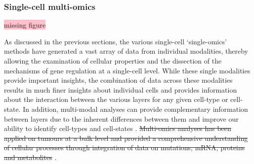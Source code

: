 
\subsubsection{Single-cell multi-omics}
\colorbox{pink}{missing figure}

As discussed in the previous sections, the various single-cell ‘single-omics’ methods have generated a vast array of data from individual modalities, thereby allowing the examination of cellular properties and the dissection of the mechanisms of gene regulation at a single-cell level. While these single modalities provide important insights, the combination of data across these modalities results in much finer insights about individual cells and provides information about the interaction between the various layers for any given cell-type or cell-state. In addition, multi-modal analyses can provide complementary information between layers due to the inherent differences between them and improve our ability to identify cell-types and cell-states \textbf{\cite{flynn_single-cell_2023}}. \st{Multi-omics analyses has been applied on tumours at a bulk level and provided a comprehensive understanding of cellular processes through integration of data on mutations, mRNA, proteins and metabolites} \textbf{\cite{lee_single-cell_2020}}.
\\\\
